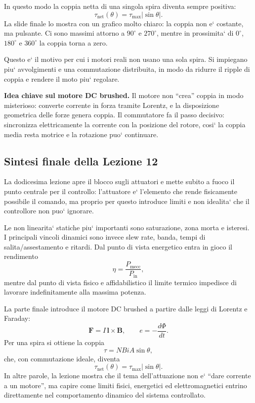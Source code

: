 \documentclass[11pt,a4paper]{article}
\begin{document}
In questo modo la coppia netta di una singola spira diventa sempre positiva:
\[
\tau_{\text{net}}(\theta)=\tau_{\max}|\sin\theta|.
\]
La slide finale lo mostra con un grafico molto chiaro: la coppia non e` costante, ma pulsante. Ci sono massimi attorno a \(90^\circ\) e \(270^\circ\), mentre in prossimita` di \(0^\circ\), \(180^\circ\) e \(360^\circ\) la coppia torna a zero.

Questo e` il motivo per cui i motori reali non usano una sola spira. Si impiegano piu` avvolgimenti e una commutazione distribuita, in modo da ridurre il ripple di coppia e rendere il moto piu` regolare.

\begin{keybox}
\textbf{Idea chiave sul motore DC brushed.} Il motore non ``crea'' coppia in modo misterioso: converte corrente in forza tramite Lorentz, e la disposizione geometrica delle forze genera coppia. Il commutatore fa il passo decisivo: sincronizza elettricamente la corrente con la posizione del rotore, cosi` la coppia media resta motrice e la rotazione puo` continuare.
\end{keybox}

\subsection*{Sintesi finale della Lezione 12}

La dodicesima lezione apre il blocco sugli attuatori e mette subito a fuoco il punto centrale per il controllo: l'attuatore e` l'elemento che rende fisicamente possibile il comando, ma proprio per questo introduce limiti e non idealita` che il controllore non puo` ignorare.

Le non linearita` statiche piu` importanti sono saturazione, zona morta e isteresi. I principali vincoli dinamici sono invece slew rate, banda, tempi di salita/assestamento e ritardi. Dal punto di vista energetico entra in gioco il rendimento
\[
\eta=\frac{P_{\text{mecc}}}{P_{\text{in}}},
\]
mentre dal punto di vista fisico e affidabilistico il limite termico impedisce di lavorare indefinitamente alla massima potenza.

La parte finale introduce il motore DC brushed a partire dalle leggi di Lorentz e Faraday:
\[
\mathbf F=I\,\mathbf l\times \mathbf B,
\qquad
e=-\frac{d\Phi}{dt}.
\]
Per una spira si ottiene la coppia
\[
\tau=NBiA\sin\theta,
\]
che, con commutazione ideale, diventa
\[
\tau_{\text{net}}(\theta)=\tau_{\max}|\sin\theta|.
\]
In altre parole, la lezione mostra che il tema dell'attuazione non e` ``dare corrente a un motore'', ma capire come limiti fisici, energetici ed elettromagnetici entrino direttamente nel comportamento dinamico del sistema controllato.
\end{document}

